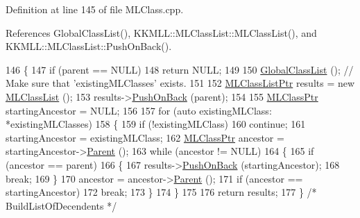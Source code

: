 Definition at line 145 of file M\+L\+Class.\+cpp.



References Global\+Class\+List(), K\+K\+M\+L\+L\+::\+M\+L\+Class\+List\+::\+M\+L\+Class\+List(), and K\+K\+M\+L\+L\+::\+M\+L\+Class\+List\+::\+Push\+On\+Back().


\begin{DoxyCode}
146 \{
147   \textcolor{keywordflow}{if}  (parent == NULL)
148     \textcolor{keywordflow}{return} NULL;
149 
150   \hyperlink{class_k_k_m_l_l_1_1_m_l_class_ad7727a26d90f35f551d3f58b5df3520f}{GlobalClassList} ();  \textcolor{comment}{// Make sure that 'existingMLClasses'  exists.}
151 
152   \hyperlink{class_k_k_m_l_l_1_1_m_l_class_list}{MLClassListPtr}  results = \textcolor{keyword}{new} \hyperlink{class_k_k_m_l_l_1_1_m_l_class_aebbe3bcd525e27070e7cc765528293b5}{MLClassList} ();
153   results->\hyperlink{class_k_k_m_l_l_1_1_m_l_class_list_ae46d4f51c041d7d4d544bf514c484295}{PushOnBack} (parent);
154 
155   \hyperlink{class_k_k_m_l_l_1_1_m_l_class}{MLClassPtr}  startingAncestor = NULL;
156 
157   \textcolor{keywordflow}{for}  (\textcolor{keyword}{auto} existingMLClass: *existingMLClasses)
158   \{
159     \textcolor{keywordflow}{if}  (!existingMLClass)
160       \textcolor{keywordflow}{continue};
161     startingAncestor = existingMLClass;
162     \hyperlink{class_k_k_m_l_l_1_1_m_l_class}{MLClassPtr} ancestor = startingAncestor->\hyperlink{class_k_k_m_l_l_1_1_m_l_class_a690ee6186141d55fef5cebd4360428e1}{Parent} ();
163     \textcolor{keywordflow}{while}  (ancestor != NULL)
164     \{
165       \textcolor{keywordflow}{if}  (ancestor == parent)
166       \{
167         results->\hyperlink{class_k_k_m_l_l_1_1_m_l_class_list_ae46d4f51c041d7d4d544bf514c484295}{PushOnBack} (startingAncestor);
168         \textcolor{keywordflow}{break};
169       \}
170       ancestor = ancestor->\hyperlink{class_k_k_m_l_l_1_1_m_l_class_a690ee6186141d55fef5cebd4360428e1}{Parent} ();
171       \textcolor{keywordflow}{if}  (ancestor == startingAncestor)
172         \textcolor{keywordflow}{break};
173     \}
174   \}
175 
176   \textcolor{keywordflow}{return}  results;
177 \}  \textcolor{comment}{/* BuildListOfDecendents */}
\end{DoxyCode}
